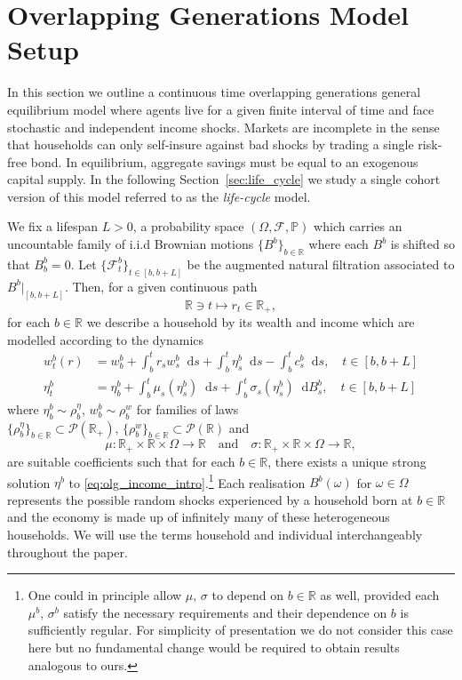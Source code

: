 \documentclass[11pt,oneside,english,reqno,dvipsnames,table]{amsart}
\numberwithin{equation}{section}
\theoremstyle{plain}
\theoremstyle{definition}
\theoremstyle{remark}
\theoremstyle{plain}
\theoremstyle{plain}
\theoremstyle{plain}
\theoremstyle{plain}
\theoremstyle{plain}
\theoremstyle{plain}
\theoremstyle{plain}
\newcommand{\dd}{\mathop{}\!\mathrm{d}}
\newcommand{\mcF}{\mathcal{F}}
\newcommand{\mcP}{\mathcal{P}}
\newcommand{\mbP}{\mathbb{P}}
\newcommand{\mbR}{\mathbb{R}}
\numberwithin{thm}{section}
\begin{document}
\section{Overlapping Generations Model Setup}\label{sec:model_setup}

In this section we outline a continuous time overlapping generations general equilibrium model where agents live for a given finite interval of time and face stochastic and independent income shocks. Markets are incomplete in the sense that households can only self‐insure against bad shocks by trading a single risk‐free bond.  In equilibrium, aggregate savings must be equal to an exogenous capital supply. In the following Section~\ref{sec:life_cycle} we study a single cohort version of this model referred to as the \textit{life-cycle} model.

We fix a lifespan $L>0$, a probability space $(\Omega,\mcF,\mbP)$ which carries an uncountable family of i.i.d  Brownian motions $\{B^b\}_{b\in \mbR}$ where each $B^b$ is shifted so that $B^b_b =0$. Let $\{\mcF^b_t\}_{t\in [b,b+L]}$ be the augmented natural filtration associated to $B^b|_{[b,b+L]}$. Then, for a given continuous path 
%
\begin{equation*}
    \mbR \ni t\mapsto r_t \in \mbR_+,
\end{equation*}
%
for each $b\in \mbR$ we describe a household by its wealth and income which are modelled according to the dynamics
%
\begin{align}
%
        w^b_t(r) &= w^b_b + \int_b^t r_s w^{b}_s \dd s + \int_b^t \eta^b_s  \dd s - \int_b^t c_s^b \dd s, \quad t\in [b,b+L]\label{eq:olg_wealth_intro}
        \\
\eta^b_t &= \eta^b_b +\int_{b}^t \mu_s(\eta^b_s) \dd s + \int_{b}^t \sigma_s(\eta^b_s) \dd B^b_s, \quad t\in [b,b+L] \label{eq:olg_income_intro}
%
%
\end{align}
%
where $\eta^b_b \sim \rho^\eta_b$, $w^b_b \sim \rho^w_b$ for families of laws $\{\rho^\eta_b\}_{b\in \mbR} \subset \mcP(\mbR_+),\, \{\rho^w_b\}_{b\in \mbR} \subset \mcP(\mbR)$ and
%
\begin{equation*}
    \mu:\mbR_+\times \mbR \times \Omega \to \mbR \quad \text{and}\quad \sigma:\mbR_+\times \mbR \times \Omega \to \mbR,
\end{equation*}
  are suitable coefficients such that for each $b\in \mbR$, there exists a unique strong solution $\eta^b$ to \eqref{eq:olg_income_intro}.\footnote{One could in principle allow $\mu,\,\sigma$ to depend on $b\in \mbR$ as well, provided each $\mu^b,\,\sigma^b$ satisfy the necessary requirements and their dependence on $b$ is sufficiently regular. For simplicity of presentation we do not consider this case here but no fundamental change would be required to obtain results analogous to ours.} Each realisation $B^b(\omega)$ for $\omega\in \Omega$ represents the possible random shocks experienced by a household born at $b\in \mbR$ and the economy is made up of infinitely many of these heterogeneous households. We will use the terms household and individual interchangeably throughout the paper.
\end{document}
